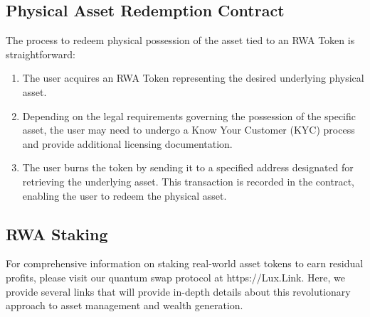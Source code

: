 \documentclass[11pt]{article}
\begin{document}
\subsection{Physical Asset Redemption Contract}

The process to redeem physical possession of the asset tied to an RWA Token is straightforward:

\begin{enumerate}
  \item The user acquires an RWA Token representing the desired underlying physical asset.
  \item Depending on the legal requirements governing the possession of the specific asset, the user may need to undergo a Know Your Customer (KYC) process and provide additional licensing documentation.
  \item The user burns the token by sending it to a specified address designated for retrieving the underlying asset. This transaction is recorded in the contract, enabling the user to redeem the physical asset.
\end{enumerate}

\subsection{RWA Staking}

For comprehensive information on staking real-world asset tokens to earn residual profits, please visit our quantum swap protocol at https://Lux.Link. Here, we provide several links that will provide in-depth details about this revolutionary approach to asset management and wealth generation.
\end{document}
